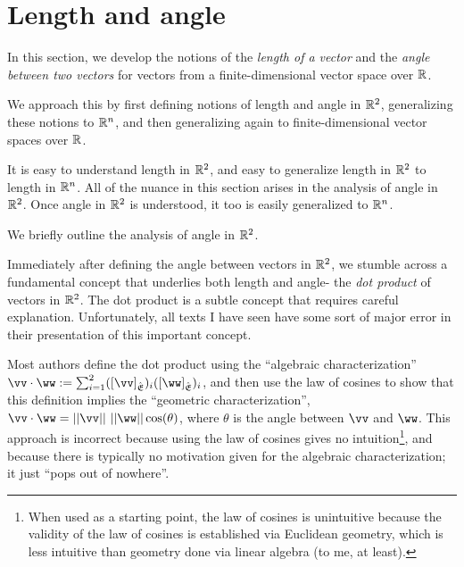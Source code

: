 \newpage

\section{Length and angle}
\label{ch::lin_alg::section::dot_product}

In this section, we develop the notions of the \textit{length of a vector} and the \textit{angle between two vectors} for vectors from a finite-dimensional vector space over $\mathbb{R}$. 

We approach this by first defining notions of length and angle in $\mathbb{R}^2$, generalizing these notions to $\mathbb{R}^n$, and then generalizing again to finite-dimensional vector spaces over $\mathbb{R}$.

It is easy to understand length in $\mathbb{R}^2$, and easy to generalize length in $\mathbb{R}^2$ to length in $\mathbb{R}^n$. All of the nuance in this section arises in the analysis of angle in $\mathbb{R}^2$. Once angle in $\mathbb{R}^2$ is understood, it too is easily generalized to $\mathbb{R}^n$.

\vspace{.5cm}

We briefly outline the analysis of angle in $\mathbb{R}^2$.

Immediately after defining the angle between vectors in $\mathbb{R}^2$, we stumble across a fundamental concept that underlies both length and angle- the \textit{dot product} of vectors in $\mathbb{R}^2$. The dot product is a subtle concept that requires careful explanation. Unfortunately, all texts I have seen have some sort of major error in their presentation of this important concept.

Most authors define the dot product using the ``algebraic characterization'' ${\vv \cdot \ww := \sum_{i = 1}^2 ([\vv]_\sE)_i ([\ww]_\sE)_i}$, and then use the law of cosines to show that this definition implies the ``geometric characterization'', ${\vv \cdot \ww = ||\vv|| \spc ||\ww|| \cos(\theta)}$, where $\theta$ is the angle between $\vv$ and $\ww$. This approach is incorrect because using the law of cosines gives no intuition\footnote{When used as a starting point, the law of cosines is unintuitive because the validity of the law of cosines is established via Euclidean geometry, which is less intuitive than geometry done via linear algebra (to me, at least).}, and because there is typically no motivation given for the algebraic characterization; it just ``pops out of nowhere''.

